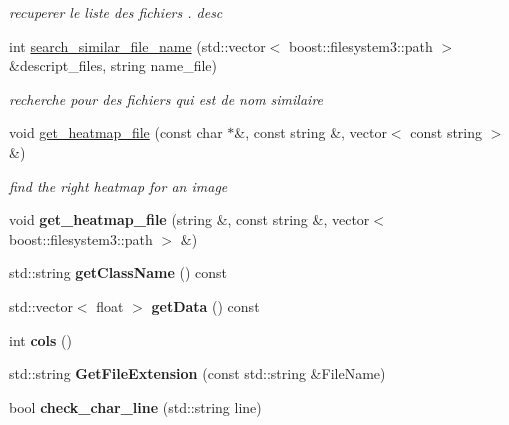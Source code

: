 \begin{DoxyCompactItemize}
\begin{DoxyCompactList}\small\item\em recuperer le liste des fichiers . desc \end{DoxyCompactList}\item 
\hypertarget{class_fichiers_af5c9e1b220e43e64210758303ce32146}{
int \hyperlink{class_fichiers_af5c9e1b220e43e64210758303ce32146}{search\_\-similar\_\-file\_\-name} (std::vector$<$ boost::filesystem3::path $>$ \&descript\_\-files, string name\_\-file)}
\label{class_fichiers_af5c9e1b220e43e64210758303ce32146}

\begin{DoxyCompactList}\small\item\em recherche pour des fichiers qui est de nom similaire \end{DoxyCompactList}\item 
\hypertarget{class_fichiers_ad8f8507d1f302c2755de50afe134037e}{
void \hyperlink{class_fichiers_ad8f8507d1f302c2755de50afe134037e}{get\_\-heatmap\_\-file} (const char $\ast$\&, const string \&, vector$<$ const string $>$ \&)}
\label{class_fichiers_ad8f8507d1f302c2755de50afe134037e}

\begin{DoxyCompactList}\small\item\em find the right heatmap for an image \end{DoxyCompactList}\item 
\hypertarget{class_fichiers_a2fe44b3db8476a2176650a807700a2f5}{
void {\bfseries get\_\-heatmap\_\-file} (string \&, const string \&, vector$<$ boost::filesystem3::path $>$ \&)}
\label{class_fichiers_a2fe44b3db8476a2176650a807700a2f5}

\item 
\hypertarget{class_fichiers_ae52b68e7dbf1120301c43b904bf7dbba}{
std::string {\bfseries getClassName} () const }
\label{class_fichiers_ae52b68e7dbf1120301c43b904bf7dbba}

\item 
\hypertarget{class_fichiers_a337fad220890c8bf5bf51256a6388b0e}{
std::vector$<$ float $>$ {\bfseries getData} () const }
\label{class_fichiers_a337fad220890c8bf5bf51256a6388b0e}

\item 
\hypertarget{class_fichiers_a59feea6891c7d9b84b159895737779cb}{
int {\bfseries cols} ()}
\label{class_fichiers_a59feea6891c7d9b84b159895737779cb}

\item 
\hypertarget{class_fichiers_aaa8618539db5ea00fe33617a6ecb8f20}{
std::string {\bfseries GetFileExtension} (const std::string \&FileName)}
\label{class_fichiers_aaa8618539db5ea00fe33617a6ecb8f20}

\item 
\hypertarget{class_fichiers_a39f592884e5b403e4d5e8e99b1a5ece0}{
bool {\bfseries check\_\-char\_\-line} (std::string line)}
\label{class_fichiers_a39f592884e5b403e4d5e8e99b1a5ece0}

\end{DoxyCompactItemize}


